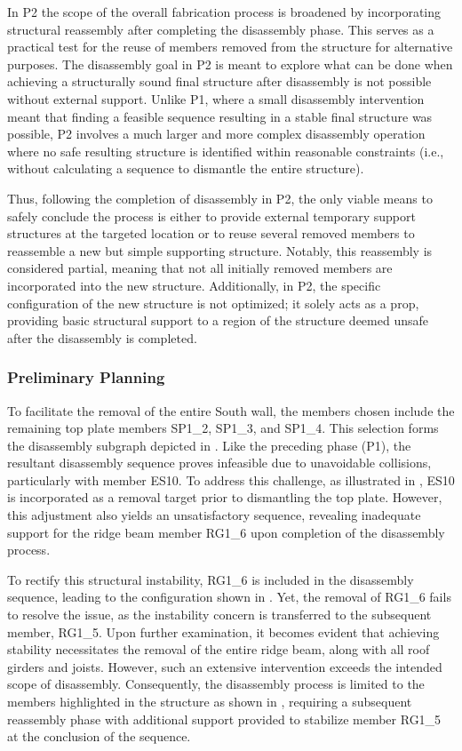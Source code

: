     In P2 the scope of the overall fabrication process is broadened by incorporating structural reassembly after completing the disassembly phase. This serves as a practical test for the reuse of members removed from the structure for alternative purposes. The disassembly goal in P2 is meant to explore what can be done when achieving a structurally sound final structure after disassembly is not possible without external support. Unlike P1, where a small disassembly intervention meant that finding a feasible sequence resulting in a stable final structure was possible, P2 involves a much larger and more complex disassembly operation where no safe resulting structure is identified within reasonable constraints (i.e., without calculating a sequence to dismantle the entire structure).
    
    Thus, following the completion of disassembly in P2, the only viable means to safely conclude the process is either to provide external temporary support structures at the targeted location or to reuse several removed members to reassemble a new but simple supporting structure. Notably, this reassembly is considered partial, meaning that not all initially removed members are incorporated into the new structure. Additionally, in P2, the specific configuration of the new structure is not optimized; it solely acts as a prop, providing basic structural support to a region of the structure deemed unsafe after the disassembly is completed.

\subsubsection{Preliminary Planning}
    To facilitate the removal of the entire South wall, the members chosen include the remaining top plate members SP1\_2, SP1\_3, and SP1\_4. This selection forms the disassembly subgraph depicted in . Like the preceding phase (P1), the resultant disassembly sequence proves infeasible due to unavoidable collisions, particularly with member ES10. To address this challenge, as illustrated in , ES10 is incorporated as a removal target prior to dismantling the top plate. However, this adjustment also yields an unsatisfactory sequence, revealing inadequate support for the ridge beam member RG1\_6 upon completion of the disassembly process.
    
    To rectify this structural instability, RG1\_6 is included in the disassembly sequence, leading to the configuration shown in . Yet, the removal of RG1\_6 fails to resolve the issue, as the instability concern is transferred to the subsequent member, RG1\_5. Upon further examination, it becomes evident that achieving stability necessitates the removal of the entire ridge beam, along with all roof girders and joists. However, such an extensive intervention exceeds the intended scope of disassembly. Consequently, the disassembly process is limited to the members highlighted in the structure as shown in , requiring a subsequent reassembly phase with additional support provided to stabilize member RG1\_5 at the conclusion of the sequence.


